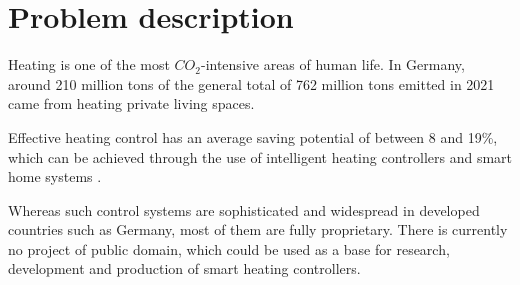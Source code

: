%
%
%

\chapter{Problem description}
\label{chap:Introduction}
%
Heating is one of the most $CO_2$-intensive areas of human life. In Germany, around 210 million tons of the general total of 762 million tons emitted in 2021 came from heating private living spaces. \cite{StatistischesBundesamt.16.07.2025} \cite{Umweltbundesamt.13.10.2025}

Effective heating control has an average saving potential of between 8 and 19\%, which can be achieved through the use of intelligent heating controllers and smart home systems \cite{Kersken.2018}. 

Whereas such control systems are sophisticated and widespread in developed countries such as Germany, most of them are fully proprietary. There is currently no project of public domain, which could be used as a base for research, development and production of smart heating controllers.